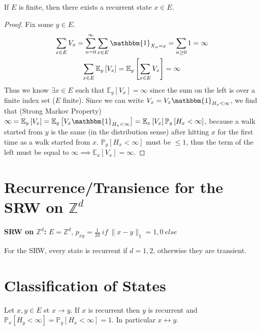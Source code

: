 \begin{prop}[]
	If $E$ is finite, then there exists a recurrent state $x \in E$.
\end{prop}
\begin{proof}
	Fix some $y \in E$.
	\begin{gather}
		\sum_{x \in E}^{} V_x = \sum_{n=0}^{\infty} \sum_{x \in E}^{} \mathbbm{1}_{X_n =x} = \sum_{n\geq 0}^{} 1  = \infty \\
	\sum_{x \in E}^{} \mathbb{E}_{y} \left[ V_x \right] = \mathbb{E}_{y} \left[ \sum_{x \in E}^{} V_x \right] = \infty \\
	\end{gather}
	Thus we know $\exists x \in E$ such that $\mathbb{E}_{y} \left[ V_x \right] = \infty$ since the sum on the left is over a finite index set ($E$ finite). Since we can write $V_x = V_x \mathbbm{1}_{H_x<\infty}$, we find that (Strong Markov Property) $\infty = \mathbb{E}_{y} \left[ V_x \right] = \mathbb{E}_{y} \left[ V_x \mathbbm{1}_{H_x<\infty}  \right] = \mathbb{E}_{x} \left[ V_x \right] \mathbb{P}_{y} \left[ H_x < \infty \right] $, because a walk started from $y$ is the same (in the distribution sense) after hitting $x$ for the first time as a walk started from $x$. $\mathbb{P}_{y} \left[ H_x < \infty \right]$ must be $ \leq 1 $, thus the term of the left must be equal to $\infty \implies \mathbb{E}_{x} \left[ V_x \right] = \infty$.
\end{proof}


\section{Recurrence/Transience for the SRW on $\mathbb{Z}^d$}
\textbf{SRW on $\mathbb{Z}^d$:} $E=\mathbb{Z}^d$, $p_{xy}=\frac{1}{2d}\ if\ \|x-y\|_1=1, 0\ else$ 

\begin{theorem}[]
	For the SRW, every state is recurrent if $d=1,2$, otherwise they are transient.
\end{theorem}

\section{Classification of States}
\begin{theorem}[]
	Let $x,y \in E$ st $x \to y$. If $x $ is recurrent then $y$ is recurrent and $\mathbb{P}_{x} \left[ H_y<\infty \right] = \mathbb{P}_{y} \left[ H_x<\infty \right]=1 $.
	In particular $x \leftrightarrow y$.
\end{theorem}

